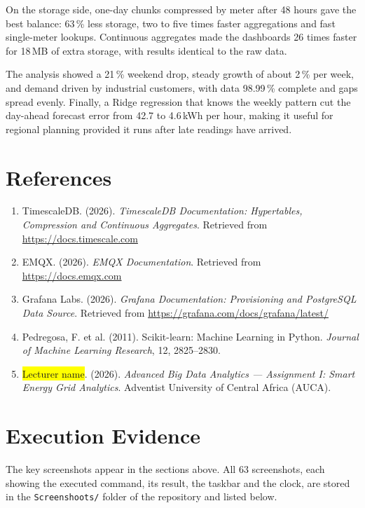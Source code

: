 \documentclass[11pt,a4paper]{article}
\newcommand{\fillin}[1]{\colorbox{yellow}{#1}}
\begin{document}
On the storage side, one-day chunks compressed by meter after 48 hours gave the best balance: 63\,\% less storage, two to five times faster aggregations and fast single-meter lookups. Continuous aggregates made the dashboards 26 times faster for 18\,MB of extra storage, with results identical to the raw data.

The analysis showed a 21\,\% weekend drop, steady growth of about 2\,\% per week, and demand driven by industrial customers, with data 98.99\,\% complete and gaps spread evenly. Finally, a Ridge regression that knows the weekly pattern cut the day-ahead forecast error from 42.7 to 4.6\,kWh per hour, making it useful for regional planning provided it runs after late readings have arrived.

\section{References}

\begin{enumerate}
\item TimescaleDB. (2026). \textit{TimescaleDB Documentation: Hypertables, Compression and Continuous Aggregates}. Retrieved from \url{https://docs.timescale.com}
\item EMQX. (2026). \textit{EMQX Documentation}. Retrieved from \url{https://docs.emqx.com}
\item Grafana Labs. (2026). \textit{Grafana Documentation: Provisioning and PostgreSQL Data Source}. Retrieved from \url{https://grafana.com/docs/grafana/latest/}
\item Pedregosa, F. et al. (2011). Scikit-learn: Machine Learning in Python. \textit{Journal of Machine Learning Research}, 12, 2825--2830.
\item \fillin{Lecturer name}. (2026). \textit{Advanced Big Data Analytics --- Assignment I: Smart Energy Grid Analytics}. Adventist University of Central Africa (AUCA).
\end{enumerate}

\section*{Execution Evidence}

The key screenshots appear in the sections above. All 63 screenshots, each showing the executed command, its result, the taskbar and the clock, are stored in the \texttt{Screenshoots/} folder of the repository and listed below.
\end{document}
